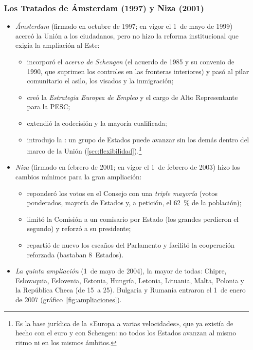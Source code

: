 \documentclass[11pt]{article}
\begin{document}
\begin{infografia}[H]
\centering
\caption{De los 3~pilares de Maastricht a los 2~Tratados de Lisboa}\label{figu:tratados}
\end{infografia}

\subsubsection{Los Tratados de Ámsterdam (1997) y Niza (2001)}\label{sec:amsterdam-niza}

\begin{itemize}
\item \emph{Ámsterdam} (firmado en octubre de 1997; en vigor el 1~de mayo de 1999) acercó la Unión a los ciudadanos, pero no hizo la reforma institucional que exigía la ampliación al Este:
  \begin{itemize}
  \item incorporó el \emph{acervo de Schengen} (el acuerdo de 1985 y su convenio de 1990, que suprimen los controles en las fronteras interiores) y pasó al pilar comunitario el asilo, los visados y la inmigración;
  \item creó la \emph{Estrategia Europea de Empleo} y el cargo de Alto Representante para la PESC;
  \item extendió la codecisión y la mayoría cualificada;
  \item introdujo la : un grupo de Estados puede avanzar sin los demás dentro del marco de la Unión (\ref{sec:flexibilidad}).\footnote{Es la base jurídica de la «Europa a varias velocidades», que ya existía de hecho con el euro y con Schengen: no todos los Estados avanzan al mismo ritmo ni en los mismos ámbitos.}
  \end{itemize}
\item \emph{Niza} (firmado en febrero de 2001; en vigor el 1~de febrero de 2003) hizo los cambios mínimos para la gran ampliación:
  \begin{itemize}
  \item reponderó los votos en el Consejo con una \emph{triple mayoría} (votos ponderados, mayoría de Estados y, a petición, el 62~\% de la población);
  \item limitó la Comisión a un comisario por Estado (los grandes perdieron el segundo) y reforzó a su presidente;
  \item repartió de nuevo los escaños del Parlamento y facilitó la cooperación reforzada (bastaban 8~Estados).
  \end{itemize}
\item \emph{La quinta ampliación} (1~de mayo de 2004), la mayor de todas: Chipre, Eslovaquia, Eslovenia, Estonia, Hungría, Letonia, Lituania, Malta, Polonia y la República Checa (de 15~a 25). Bulgaria y Rumanía entraron el 1~de enero de 2007 (gráfico~\ref{fig:ampliaciones}).
\end{itemize}
\end{document}
